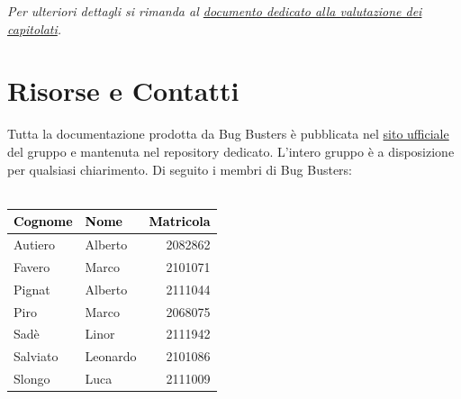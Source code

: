 \documentclass[a4paper,11pt]{article}
\begin{document}
\vspace{1em}

\begin{tcolorbox}[
    colback=lightgray,
    colframe=secondarycolor,
    arc=2mm,
    boxrule=0pt,
    left=10pt,
    right=10pt,
    top=8pt,
    bottom=8pt
]
    \small\textit{Per ulteriori dettagli si rimanda al \href{https://bugbustersunipd.github.io/BugBusterSite/assets/docs/SCELTA_CAPITOLATO/Resoconto_capitolati.pdf}{documento dedicato alla valutazione dei capitolati}.}
\end{tcolorbox}


\section*{Risorse e Contatti}

Tutta la documentazione prodotta da Bug Busters è pubblicata nel \href{https://bugbustersunipd.github.io/BugBusterSite/}{sito ufficiale} del gruppo e mantenuta nel repository dedicato.
L'intero gruppo è a disposizione per qualsiasi chiarimento. Di seguito i membri di Bug Busters: \\ \\ 
\begin{center}
\setlength{\arrayrulewidth}{0.8pt}
\begin{tabular}{|l|l|r|}
\hline
\rowcolor{primarycolor!20}
\textcolor{black}{\textbf{Cognome}} & \textcolor{black}{\textbf{Nome}} & \textcolor{black}{\textbf{Matricola}} \\
\hline
Autiero & Alberto & 2082862 \\
\hline
Favero & Marco & 2101071 \\
\hline
Pignat & Alberto & 2111044 \\
\hline
Piro & Marco & 2068075 \\
\hline
Sadè & Linor & 2111942 \\
\hline
Salviato & Leonardo & 2101086 \\
\hline
Slongo & Luca & 2111009 \\
\hline
\end{tabular}
\end{center}
\end{document}
